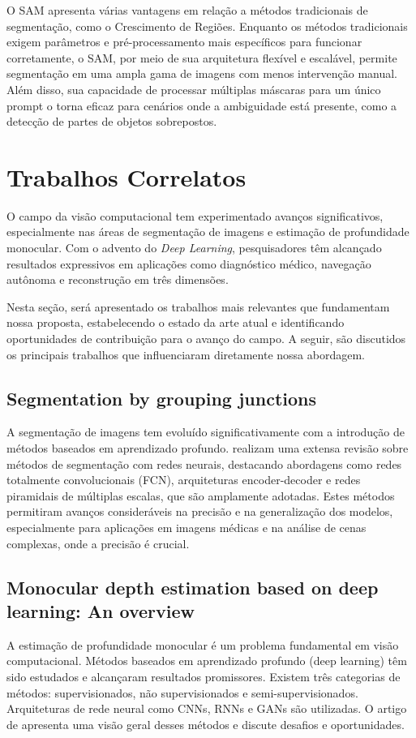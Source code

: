 O SAM apresenta várias vantagens em relação a métodos tradicionais de segmentação, como o Crescimento de Regiões. Enquanto os métodos tradicionais exigem parâmetros e pré-processamento mais específicos para funcionar corretamente, o SAM, por meio de sua arquitetura flexível e escalável, permite segmentação em uma ampla gama de imagens com menos intervenção manual. Além
disso, sua capacidade de processar múltiplas máscaras para um único prompt o torna eficaz para cenários onde a ambiguidade está presente, como a detecção de partes de objetos sobrepostos.

\section{Trabalhos Correlatos}

O campo da visão computacional tem experimentado avanços significativos, especialmente nas áreas de segmentação de imagens e estimação de profundidade monocular. Com o advento do \textit{Deep Learning}, pesquisadores têm alcançado resultados expressivos em aplicações como diagnóstico médico, navegação autônoma e reconstrução em três dimensões.

Nesta seção, será apresentado os trabalhos mais relevantes que fundamentam nossa proposta, estabelecendo o estado da arte atual e identificando oportunidades de contribuição para o avanço do campo. A seguir, são discutidos os principais trabalhos que influenciaram diretamente nossa abordagem.

\subsection{Segmentation by grouping junctions}

A segmentação de imagens tem evoluído significativamente com a introdução de métodos baseados em aprendizado profundo. realizam uma extensa revisão sobre métodos de segmentação com redes neurais, destacando abordagens como redes totalmente convolucionais (FCN), arquiteturas encoder-decoder e redes piramidais de múltiplas escalas, que são amplamente adotadas. Estes métodos permitiram avanços consideráveis na precisão e na generalização dos modelos, especialmente para aplicações em imagens médicas e na análise de cenas complexas, onde a precisão é crucial.

\subsection{Monocular depth estimation based on deep learning: An overview}

A estimação de profundidade monocular é um problema fundamental em visão computacional. Métodos baseados em aprendizado profundo (deep learning) têm sido estudados e alcançaram resultados promissores. Existem três categorias de métodos: supervisionados, não supervisionados e semi-supervisionados. Arquiteturas de rede neural como CNNs, RNNs e GANs são utilizadas. O artigo de \cite{zhao2020monocular} apresenta uma visão geral desses métodos e discute desafios e oportunidades.